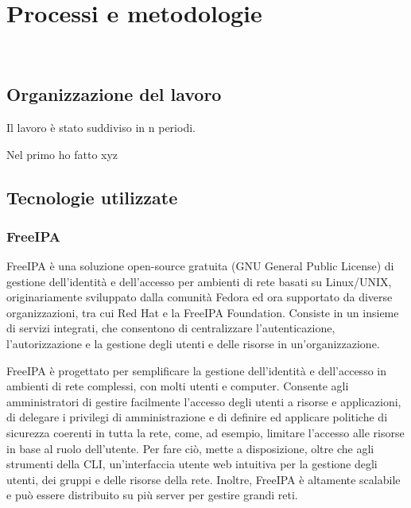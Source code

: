 
\chapter{Processi e metodologie}
\label{cap:processi-metodologie}

\\

\section{Organizzazione del lavoro}

Il lavoro è stato suddiviso in n periodi.

Nel primo ho fatto xyz

\section{Tecnologie utilizzate}
\subsection{FreeIPA}
FreeIPA è una soluzione open-source gratuita (GNU General Public License) di gestione dell'identità e dell'accesso per ambienti di rete basati su Linux/UNIX, originariamente sviluppato dalla comunità Fedora ed ora supportato da diverse organizzazioni, tra cui Red Hat e la FreeIPA Foundation. Consiste in un insieme di servizi integrati, che consentono di centralizzare l'autenticazione, l'autorizzazione e la gestione degli utenti e delle risorse in un'organizzazione.

FreeIPA è progettato per semplificare la gestione dell'identità e dell'accesso in ambienti di rete complessi, con molti utenti e computer. Consente agli amministratori di gestire facilmente l'accesso degli utenti a risorse e applicazioni, di delegare i privilegi di amministrazione e di definire ed applicare politiche di sicurezza coerenti in tutta la rete, come, ad esempio, limitare l'accesso alle risorse in base al ruolo dell'utente. Per fare ciò, mette a disposizione, oltre che agli strumenti della CLI, un'interfaccia utente web intuitiva per la gestione degli utenti, dei gruppi e delle risorse della rete. Inoltre, FreeIPA è altamente scalabile e può essere distribuito su più server per gestire grandi reti.

